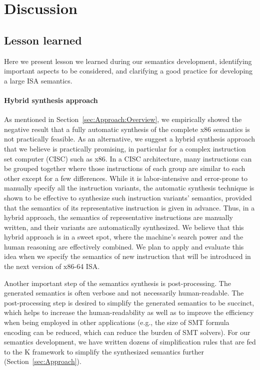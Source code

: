 \section{Discussion}

\subsection{Lesson learned}
\label{sec:lesson-learned}

Here we present lesson we learned during our semantics development, identifying important aspects to be considered, and clarifying a good practice for developing a large ISA semantics.

\paragraph{Hybrid synthesis approach}

As mentioned in Section~\ref{sec:Approach:Overview}, we empirically showed the negative result that a fully automatic synthesis of the complete x86 semantics is not practically feasible. As an alternative, we suggest a hybrid synthesis approach that we believe is practically promising, in particular for a complex instruction set computer (CISC) such as x86. In a CISC architecture, many instructions can be grouped together where those instructions of each group are similar to each other except for a few differences. While it is labor-intensive and error-prone to manually specify all the instruction variants, the automatic synthesis technique is shown to be effective to synthesize such instruction variants' semantics, provided that the semantics of its representative instruction is given in advance. Thus, in a hybrid approach, the semantics of representative instructions are manually written, and their variants are automatically synthesized. We believe that this hybrid approach is in a sweet spot, where the machine's search power and the human reasoning are effectively combined. We plan to apply and evaluate this idea when we specify the semantics of new instruction that will be introduced in the next version of x86-64 ISA.

Another important step of the semantics synthesis is post-processing. The generated semantics is often verbose and not necessarily human-readable. The post-processing step is desired to simplify the generated semantics to be succinct, which helps to increase the human-readability as well as to improve the efficiency when being employed in other applications (e.g., the size of SMT formula encoding can be reduced, which can reduce the burden of SMT solvers). For our semantics development, we have written dozens of simplification rules that are fed to the K framework to simplify the synthesized semantics further (Section~\ref{sec:Approach}).

